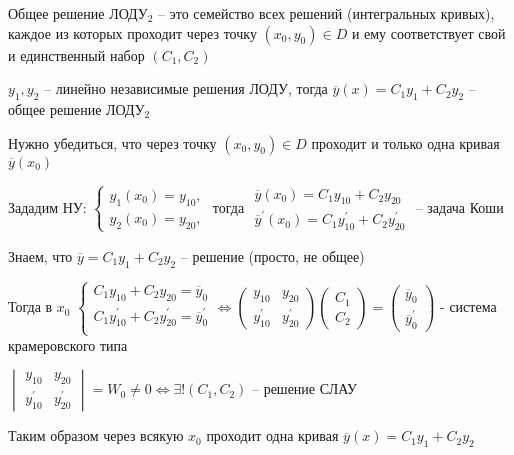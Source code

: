 \documentclass[12pt]{article}
\begin{document}
    \Nota Общее решение ЛОДУ$_2$ -- это семейство всех решений (интегральных кривых), каждое из которых проходит через точку
    $(x_0, y_0) \in D$ и ему соответствует свой и единственный набор $(C_1, C_2)$

    \begin{MyTheorem}
         $y_1, y_2$ -- линейно независимые решения ЛОДУ, тогда $\overline{y}(x) = C_1 y_1 + C_2 y_2$ -- общее решение ЛОДУ$_2$
    \end{MyTheorem}

    \begin{MyProof}
        Нужно убедиться, что через точку $(x_0, y_0) \in D$ проходит и только одна кривая $\overline{y}(x_0)$

        Зададим НУ: $\begin{cases}
                        y_1(x_0) = y_{10}, \\
                        y_2(x_0) = y_{20},
        \end{cases}$ тогда $\begin{matrix}\overline{y}(x_0) = C_1 y_{10} + C_2 y_{20} \\ \overline{y}^\prime(x_0) = C_1 y_{10}^\prime + C_2 y_{20}^\prime\end{matrix}$ -- задача Коши

        Знаем, что $\overline{y} = C_1 y_1 + C_2 y_2$ -- решение (просто, не общее)

        Тогда в $x_0$ $\begin{cases}
                        C_1 y_{10} + C_2 y_{20} = \overline{y}_0 \\
                        C_1 y_{10}^\prime + C_2 y_{20}^\prime = \overline{y}_0^\prime \\
        \end{cases} \Longleftrightarrow \begin{pmatrix}y_{10} & y_{20} \\ y_{10}^\prime & y_{20}^\prime \end{pmatrix} \begin{pmatrix}C_1 \\ C_2\end{pmatrix} = \begin{pmatrix}\overline{y}_0 \\ \overline{y}^\prime_0\end{pmatrix}$ -
        система крамеровского типа

        $\begin{vmatrix}y_{10} & y_{20} \\ y^\prime_{10} & y^\prime_{20}\end{vmatrix} = W_0 \neq 0 \Longleftrightarrow \exists! (C_1, C_2)$ -- решение СЛАУ

        Таким образом через всякую $x_0$ проходит одна кривая $\overline{y}(x) = C_1 y_1 + C_2 y_2$

    \end{MyProof}
\end{document}
